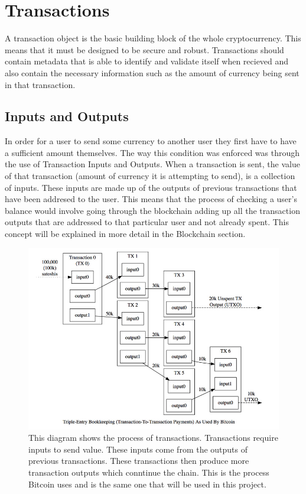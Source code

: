 \documentclass{l4proj}
\begin{document}

\section{Transactions}
A transaction object is the basic building block of the whole cryptocurrency. This means that it must be designed 
to be secure and robust. Transactions should contain metadata that is able to identify and validate itself when
recieved and also contain the necessary information such as the amount of currency being sent in that transaction.

\subsection{Inputs and Outputs}
In order for a user to send some currency to another user they first have to have a sufficient amount themselves. The
way this condition was enforced was through the use of Transaction Inputs and Outputs. When a transaction is
sent, the value of that transaction (amount of currency it is attempting to send), is a collection of inputs. These inputs
are made up of the outputs of previous transactions that have been addresed to the user. This means that the process of
checking a user's balance would involve going through the blockchain adding up all the transaction outputs that
are addressed to that particular user and not already spent. This concept will be explained in more detail in the Blockchain section.

\begin{figure}[!ht]
    \centering
    \includegraphics[width=1\linewidth]{images/utxo-model.jpg}    

    \caption{
        This diagram shows the process of transactions. Transactions require inputs to send value. These inputs come from
        the outputs of previous transactions. These transactions then produce more transaction outputs which conntinue
        the chain. This is the process Bitcoin uses and is the same one that will be used in this project.
    }

    \label{fig:transaction} 
\end{figure}
\end{document}
